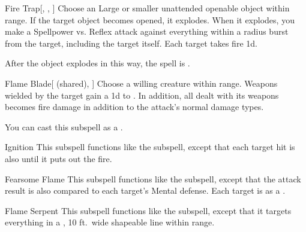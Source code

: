 \begin{ability}[\nth{3}]{Fire Trap}[, , ]
Choose an Large or smaller unattended openable object within \rngclose range.
If the target object becomes opened, it explodes.
When it explodes, you make a Spellpower vs. Reflex attack against everything within a \areamed radius burst from the target, including the target itself.
\hit Each target takes fire  \minus1d.

After the object explodes in this way, the spell is .
\end{ability}
\vspace{0.25em}


\begin{ability}[\nth{3}]{Flame Blade}[ (shared), ]
Choose a willing creature within \rngclose range.
Weapons wielded by the target gain a \plus1d  to .
In addition, all  dealt with its weapons becomes fire damage in addition to the attack's normal damage types.

You can cast this subspell as a .
\end{ability}
\vspace{0.25em}


\begin{ability}[\nth{3}]{Ignition}
This subspell functions like the  subspell, except that each target hit is also  until it puts out the fire.
\end{ability}
\vspace{0.25em}


\begin{ability}[\nth{4}]{Fearsome Flame}
This subspell functions like the  subspell, except that the attack result is also compared to each target's Mental defense.
\hit Each target is  as a .
\end{ability}
\vspace{0.25em}


\begin{ability}[\nth{4}]{Flame Serpent}
This subspell functions like the  subspell, except that it targets everything in a \arealarge, 10 ft.\ wide shapeable line within \rngmed range.
\end{ability}
\vspace{0.25em}


